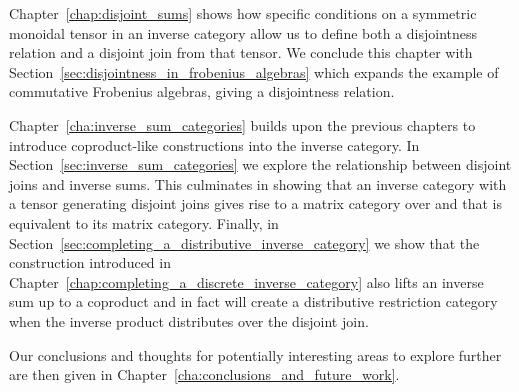Chapter~\ref{chap:disjoint_sums} shows how specific conditions on a symmetric monoidal
tensor in an inverse category allow us to define both a disjointness relation and a disjoint join
from that tensor. We conclude this chapter with Section~\ref{sec:disjointness_in_frobenius_algebras}
which expands the example of commutative Frobenius algebras, giving a disjointness relation.

Chapter~\ref{cha:inverse_sum_categories} builds upon the previous chapters to introduce
coproduct-like constructions into the inverse
category.  In
Section~\ref{sec:inverse_sum_categories} we explore the relationship between disjoint joins and
inverse sums. This culminates in showing that an inverse category \X with a tensor generating disjoint
joins gives rise to a matrix category over \X and that \X is equivalent to its matrix
category. Finally, in Section~\ref{sec:completing_a_distributive_inverse_category} we show that the
construction introduced in Chapter~\ref{chap:completing_a_discrete_inverse_category} also lifts an
inverse sum up to a coproduct and in fact will create a distributive restriction category when the
inverse product distributes over the disjoint join.

Our conclusions and thoughts for potentially interesting areas to explore further are then given in
Chapter~\ref{cha:conclusions_and_future_work}.



